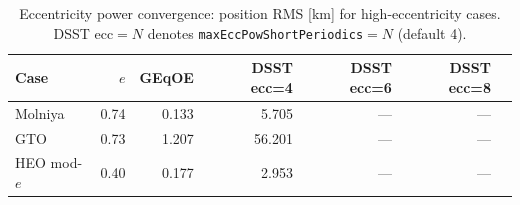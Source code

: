 \begin{table}[ht]
\centering
\caption{Eccentricity power convergence: position RMS [km] for
high-eccentricity cases. DSST ecc$=N$ denotes
\texttt{maxEccPowShortPeriodics}$=N$ (default 4).}
\label{tab:dsst_ecc_power}
\small
\begin{tabular}{@{}lrrrrrr@{}}
\toprule
Case & $e$ & GEqOE & DSST ecc=4 & DSST ecc=6 & DSST ecc=8 \\
\midrule
Molniya & 0.74 & 0.133 & 5.705 & --- & --- \\
GTO & 0.73 & 1.207 & 56.201 & --- & --- \\
HEO mod-$e$ & 0.40 & 0.177 & 2.953 & --- & --- \\
\bottomrule
\end{tabular}
\end{table}